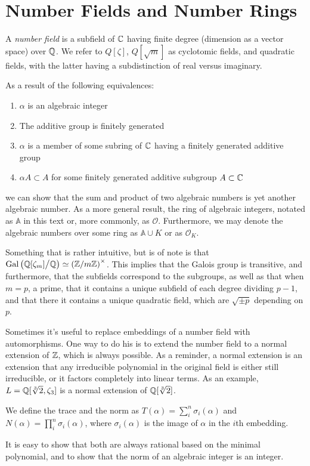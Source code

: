 \documentclass{article}
\begin{document}
\section{Number Fields and Number Rings}
\begin{definition}
A \textit{number field} is a subfield of \(\mathbb C\) having finite degree (dimension as a vector space) over \(\mathbb Q\). We refer to \(Q[\zeta]\), \(Q[\sqrt{m}]\) as cyclotomic fields, and quadratic fields, with the latter having a subdistinction of real versus imaginary.
\end{definition}
As a result of the following equivalences:
\begin{enumerate}
    \item \(\alpha\) is an algebraic integer
    \item The additive group is finitely generated
    \item \(\alpha\) is a member of some subring of \(\mathbb C\) having a finitely generated additive group
    \item \(\alpha A \subset A \) for some finitely generated additive subgroup \(A \subset \mathbb C\)
\end{enumerate}
we can show that the sum and product of two algebraic numbers is yet another algebraic number. As a more general result, the ring of algebraic integers, notated as \(\mathbb{A} \) in this text or, more commonly, as \(\mathcal{O}\). Furthermore, we may denote the algebraic numbers over some ring as \(\mathbb{A} \cup K\) or as \(\mathcal{O}_K\).

Something that is rather intuitive, but is of note is that \(\operatorname{Gal}\left(\mathbb Q[\zeta_m] \big/ \mathbb Q \right) \simeq \left(\mathbb Z/m\mathbb Z\right)^{\times}\). This implies that the Galois group is transitive, and furthermore, that the subfields correspond to the subgroups, as well as that when \(m=p\), a prime, that it contains a unique subfield of each degree dividing \(p-1\), and that there it contains a unique quadratic field, which are \(\sqrt{\pm p}\) depending on \(p\).

Sometimes it's useful to replace embeddings of a number field with automorphisms. One way to do his is to extend the number field to a normal extension of \(\mathbb Z\), which is always possible. As a reminder, a normal extension is an extension that any irreducible polynomial in the original field is either still irreducible, or it factors completely into linear terms. As an example, \(L=\mathbb Q[\sqrt[3]{2},\zeta_3]\) is a normal extension of \(\mathbb Q[\sqrt[3]{2}]\).

\begin{definition}
We define the trace and the norm as \( T(\alpha) = \sum_{i}^n \sigma_i(\alpha) \) and \(N(\alpha) = \prod_{i}^n \sigma_i(\alpha)\), where \(\sigma_i(\alpha)\) is the image of \(\alpha\) in the \(i\)th embedding. 
\end{definition}
It is easy to show that both are always rational based on the minimal polynomial, and to show that the norm of an algebraic integer is an integer.
\end{document}
